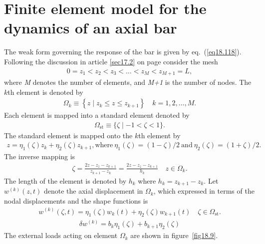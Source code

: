 \documentclass{AeroStructure-ERJohnson}
\begin{document}
\section{Finite element model for the dynamics of an axial bar}\label{sec18.7}

The weak form governing the response of the bar is given by eq.~(\ref{eq18.118}). Following the discussion in article \ref{sec17.2} on page \pageref{sec17.2} consider the mesh
\begin{align}\label{eq18.122}
0=z_{1}<z_{2}<z_{3}<\ldots<z_{M}<z_{M+1}=L,
\end{align}
where \textit{M} denotes the number of elements, and \textit{M+1} is the number of nodes. The $k$th element is denoted by
\begin{align}\label{eq18.123}
\Omega_{k} \equiv\left\{z \mid z_{k} \leq z \leq z_{k+1}\right\} \quad k=1,2, \ldots, M.
\end{align}
Each element is mapped into a standard element denoted by
\begin{align}\label{eq18.124}
\Omega_{\mathrm{st}} \equiv\{\zeta \mid-1<\zeta<1\}.
\end{align}
The standard element is mapped onto the $k$th element by
\begin{align}\label{eq18.125}
z=\eta_{1}(\zeta) z_{k}+\eta_{2}(\zeta) z_{k+1}, \text{where}\ \eta_{1}(\zeta)=(1-\zeta)/2\ \text{and}\ \eta_{2}(\zeta)=(1+\zeta)/2.
\end{align}
The inverse mapping is
\begin{align}\label{eq18.126}
\zeta=\frac{2 z-z_{z}-z_{k+1}}{z_{k+1}-z_{k}}=\frac{2 z-z_{z}-z_{k+1}}{h_{k}} \quad z \in \Omega_{k}.
\end{align}
The length of the element is denoted by $h_{k}$ where $h_{k}=z_{k+1}-z_{k}$. Let $w^{(k)}(z, t)$ denote the axial displacement in $\Omega_k$, which expressed in terms of the nodal displacements and the shape functions is
\begin{align}\label{eq18.127}
w^{(k)}(\zeta, t)=\eta_{1}(\zeta) w_{k}(t)+\eta_{2}(\zeta) w_{k+1}(t) \quad \zeta \in \Omega_{\mathrm{st}}.
\end{align}\begin{align}\label{eq18.128}
\delta w^{(k)}=b_{k} \eta_{1}(\zeta)+b_{k+1} \eta_{2}(\zeta)
\end{align}
The external loads acting on element $\Omega_k$ are shown in figure~\ref{fig18.9}.
\end{document}
